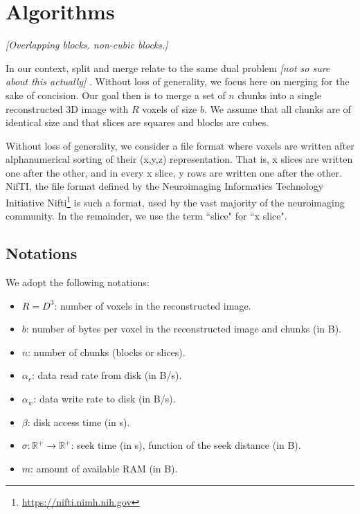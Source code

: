 \documentclass[10pt, conference, compsocconf]{IEEEtran}
\newcommand{\todo}[1]{
  \color{red}\emph{[#1]}
  \color{black}
}
\begin{document}

\newpage

\section{Algorithms}
\label{sec:algos}

\todo{Overlapping blocks. non-cubic blocks.}

In our context, split and merge relate to the same dual
problem \todo{not so sure about this actually}. Without loss of
generality, we focus here on merging for the sake of concision. Our
goal then is to merge a set of $n$ chunks into a single reconstructed
3D image with $R$ voxels of size $b$. We assume that all chunks are of
identical size and that slices are squares and blocks are cubes.

Without loss of generality, we consider a file format where voxels are
written after alphanumerical sorting of their (x,y,z)
representation. That is, x slices are written one after the other, and
in every x slice, y rows are written one after the other. NifTI, the
file format defined by the Neuroimaging Informatics Technology
Initiative Nifti\footnote{\url{https://nifti.nimh.nih.gov}} is such a
format, used by the vast majority of the neuroimaging community. In
the remainder, we use the term ``slice" for ``x slice".

\subsection{Notations}

We adopt the following notations:
\begin{itemize}
\item $R=D^3$: number of voxels in the reconstructed image.
\item $b$: number of bytes per voxel in the reconstructed image and chunks (in B).
\item $n$: number of chunks (blocks or slices).
\item $\alpha_r$: data read rate from disk (in B/s).
\item $\alpha_w$: data write rate to disk (in B/s).
\item $\beta$: disk access time (in s).
\item $\sigma: \mathbb{R}^{+} \rightarrow \mathbb{R}^{+}$: seek time (in s), function of the seek
  distance (in B).
\item $m$: amount of available RAM (in B).
\end{itemize}
\end{document}
